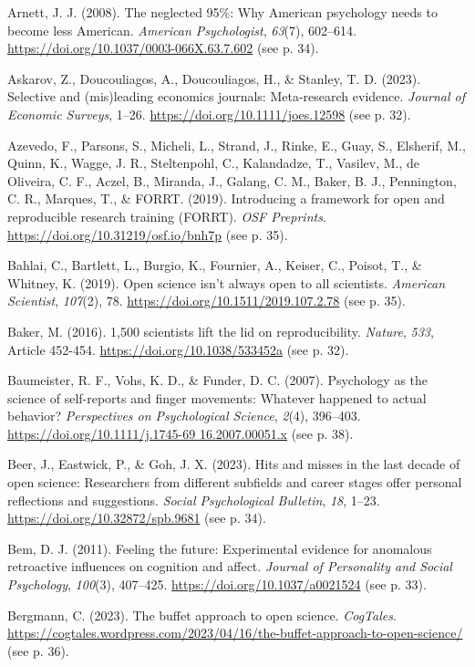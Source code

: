 \documentclass[authordate, empirical,issue]{jote-new-article}
\begin{document}
Arnett, J. J. (2008). The neglected 95\%: Why American psychology needs to become less American. \emph{American Psychologist}, \emph{63}(7), 602–614. \url{https://doi.org/10.1037/0003-066X.63.7.602} (see p. 34).

Askarov, Z., Doucouliagos, A., Doucouliagos, H., \& Stanley, T. D. (2023). Selective and (mis)leading economics journals: Meta-research evidence. \emph{Journal of Economic Surveys}, 1–26. \url{https://doi.org/10.1111/joes.12598} (see p. 32).

Azevedo, F., Parsons, S., Micheli, L., Strand, J., Rinke, E., Guay, S., Elsherif, M., Quinn, K., Wagge, J. R., Steltenpohl, C., Kalandadze, T., Vasilev, M., de Oliveira, C. F., Aczel, B., Miranda, J., Galang, C. M., Baker, B. J., Pennington, C. R., Marques, T., \& FORRT. (2019). Introducing a framework for open and reproducible research training (FORRT). \emph{OSF Preprints}. \url{https://doi.org/10.31219/osf.io/bnh7p} (see p. 35).

Bahlai, C., Bartlett, L., Burgio, K., Fournier, A., Keiser, C., Poisot, T., \& Whitney, K. (2019). Open science isn’t always open to all scientists. \emph{American Scientist}, \emph{107}(2), 78. \url{https://doi.org/10.1511/2019.107.2.78} (see p. 35).

Baker, M. (2016). 1,500 scientists lift the lid on reproducibility. \emph{Nature}, \emph{533}, Article 452-454. \url{https://doi.org/10.1038/533452a} (see p. 32).

Baumeister, R. F., Vohs, K. D., \& Funder, D. C. (2007). Psychology as the science of self-reports and finger movements: Whatever happened to actual behavior? \emph{Perspectives on Psychological Science}, \emph{2}(4), 396–403. \url{https://doi.org/10.1111/j.1745-69 16.2007.00051.x} (see p. 38).

Beer, J., Eastwick, P., \& Goh, J. X. (2023). Hits and misses in the last decade of open science: Researchers from different subfields and career stages offer personal reflections and suggestions. \emph{Social Psychological Bulletin}, \emph{18}, 1–23. \url{https://doi.org/10.32872/spb.9681} (see p. 34).

Bem, D. J. (2011). Feeling the future: Experimental evidence for anomalous retroactive influences on cognition and affect. \emph{Journal of Personality and Social Psychology}, \emph{100}(3), 407–425. \url{https://doi.org/10.1037/a0021524} (see p. 33).

Bergmann, C. (2023). The buffet approach to open science. \emph{CogTales}. \url{https://cogtales.wordpress.com/2023/04/16/the-buffet-approach-to-open-science/} (see p. 36).
\end{document}
